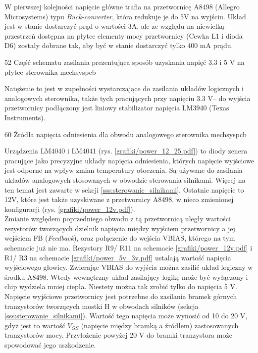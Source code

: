 W pierwszej kolejności napięcie główne trafia na przetwornicę A8498 (Allegro Microsystems) typu {\it Buck-converter}, która redukuje je do 5V na wyjściu. Układ jest w stanie dostarczyć prąd o wartości 3A, ale ze względu na niewielką przestrzeń dostępna na płytce elementy mocy przetwornicy (Cewka L1 i dioda D6) zostały dobrane tak, aby być w stanie dostarczyć tylko 400 mA prądu. 

	{52}
	{Część schematu zasilania prezentująca sposób uzyskania napięć 3.3 i 5 V na płytce sterownika}
	{mechsyspcb}

Natężenie to jest w zupełności wystarczające do zasilania układów logicznych \linebreak i analogowych sterownika, także tych pracujących przy napięciu 3.3 V-- do wyjścia przetwornicy podłączony jest liniowy stabilizator napięcia LM3940 (Texas Instruments).

	{60}
	{Źródła napięcia odniesienia dla obwodu analogowego sterownika}
	{mechsyspcb}
	
Urządzenia LM4040 i LM4041 (rys. \ref{grafiki/power_12_25.pdf}) to diody zenera pracujące jako precyzyjne układy napięcia odniesienia, których napięcie wyjściowe jest odporne na wpływ zmian temperatury otoczenia. Są używane do zasilania układów analogowych stosowanych w obwodzie sterowania silnikami. Więcej na ten temat jest zawarte w sekcji \ref{sss:sterowanie_silnikami}. Ostatnie napięcie to 12V, które jest także uzyskiwane z przetwornicy A8498, w nieco zmienionej konfiguracji (rys. \ref{grafiki/power_12v.pdf}). \\

Zmianie względem poprzedniego obwodu z tą przetwornicą uległy wartości rezystorów tworzących dzielnik napięcia między wyjściem przetwornicy a jej wejściem FB ({\it Feedback}), oraz połączenie do wejścia VBIAS, którego na tym schemacie już nie ma. Rezystory R9/ R11 na schemacie \ref{grafiki/power_12v.pdf} i R1/ R3 na schemacie \ref{grafiki/power_5v_3v.pdf} ustalają wartość napięcia wyjściowego głowicy. Zwierając VBIAS do wyjścia można zasilić układ logiczny w środku A8498. Wtedy wewnętrzny układ zasilający logikę może być wyłączony i chip wydziela mniej ciepła. Niestety można tak zrobić tylko do napięcia 5 V. Napięcie wyjściowe przetwornicy jest potrzebne do zasilania bramek górnych tranzystorów tworzących mostki H w obwodach silników (sekcja \ref{sss:sterowanie_silnikami}). Wartość tego napięcia może wynosić od 10 do 20 V, gdyż jest to wartość $ V_{GS} $ (napięcie między bramką a źródłem) zastosowanych tranzystorów mocy. Przyłożenie powyżej 20 V do bramki tranzystora może spowodować jego uszkodzenie.  

